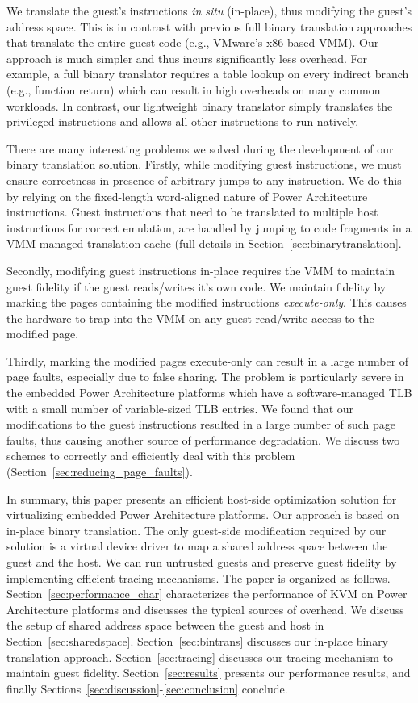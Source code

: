 \documentclass[10pt,twocolumn]{article}
\begin{document}
We translate the guest's instructions {\em in situ} (in-place), thus modifying the guest's
address space. This is in contrast with previous full binary translation approaches
that translate the entire guest
code (e.g., VMware's x86-based VMM\cite{agesen:comparison}). Our approach is much
simpler and thus incurs significantly less overhead. For example, a full binary
translator requires a table lookup on every indirect branch (e.g., function return) which
can result in high overheads on many common workloads. In contrast, our lightweight
binary translator simply translates the privileged instructions and allows all other
instructions to run natively.

There are many interesting problems we solved during the development of our
binary translation solution. 
Firstly, while modifying guest instructions, we must ensure correctness in presence
of arbitrary jumps to any instruction. We do this by relying on the fixed-length
word-aligned nature of Power Architecture instructions. Guest instructions
that need to be translated to multiple host instructions for correct emulation, are
handled by jumping to code fragments in a VMM-managed translation cache (full
details in Section~\ref{sec:binarytranslation}.

Secondly, modifying guest instructions in-place requires the VMM to maintain guest
fidelity if the guest reads/writes it's own code. We maintain fidelity by 
marking the pages containing the modified instructions {\em execute-only}. This
causes the hardware to trap into the VMM on any guest read/write access to the
modified page.

Thirdly, marking the modified pages execute-only can result in a large number of
page faults, especially due to false sharing. The problem is particularly
severe in the embedded Power Architecture platforms which have a software-managed TLB with
a small number of variable-sized TLB entries. We found that our modifications to
the guest instructions resulted in a large number of such page faults, thus causing
another source of performance degradation. We discuss two schemes to correctly
and efficiently deal with this problem (Section~\ref{sec:reducing_page_faults}).

In summary, this paper presents an efficient host-side optimization solution for
virtualizing embedded Power Architecture platforms. Our approach is based on in-place binary translation.
The only guest-side modification required by our solution is a virtual
device driver to map a shared address space between the guest and the host.
We can run untrusted guests and preserve guest fidelity by implementing efficient
tracing mechanisms.
The paper is organized as
follows. Section~\ref{sec:performance_char} characterizes the performance of
KVM on Power Architecture platforms and discusses the typical sources of overhead.
We discuss the setup of shared address space between the guest and host
in Section~\ref{sec:sharedspace}.
Section~\ref{sec:bintrans} discusses our in-place binary translation approach.
Section~\ref{sec:tracing} discusses our tracing mechanism to maintain guest fidelity.
Section~\ref{sec:results} presents our performance results, and
finally Sections~\ref{sec:discussion}-\ref{sec:conclusion} conclude.
\end{document}
